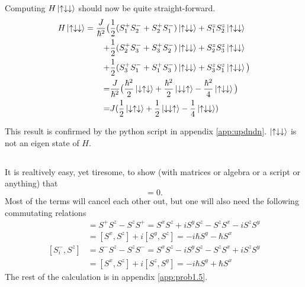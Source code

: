 \documentclass{article}
\begin{document}
Computing $H\ket{\uparrow\downarrow\downarrow}$ should now be quite straight-forward.
\begin{align*}
H\ket{\uparrow\downarrow\downarrow} = 
\frac{J}{\hbar^2} \big(&\frac{1}{2} (S_1^+S_2^- + S_2^+S_1^-)\ket{\uparrow\downarrow\downarrow} + S_1^zS_2^z\ket{\uparrow\downarrow\downarrow} \\
+&\frac{1}{2}(S_2^+S_3^- + S_3^+S_2^-)\ket{\uparrow\downarrow\downarrow} + S_2^zS_3^z\ket{\uparrow\downarrow\downarrow} \\
+&\frac{1}{2}(S_3^+S_1^- + S_1^+S_3^-)\ket{\uparrow\downarrow\downarrow} + S_3^zS_1^z\ket{\uparrow\downarrow\downarrow} \big)\\
=&\frac{J}{\hbar^2}\big(
\frac{\hbar^2}{2}\ket{\downarrow\uparrow\downarrow} + 
\frac{\hbar^2}{2}\ket{\downarrow\downarrow\uparrow} -
\frac{\hbar^2}{4}\ket{\uparrow\downarrow\downarrow} 
\big) \\
=&J(
\frac{1}{2}\ket{\downarrow\uparrow\downarrow} +
\frac{1}{2}\ket{\downarrow\downarrow\uparrow} -
\frac{1}{4}\ket{\uparrow\downarrow\downarrow})
\end{align*}

This result is confirmed by the python script in appendix \ref{app:updndn}. $\ket{\uparrow\downarrow\downarrow}$ is not an eigen state of $H$.

\subsection{}
It is realtively easy, yet tiresome, to show (with matrices or algebra or a script or anything) that
\begin{equation}
[H,S^z_{tot}]=0.
\end{equation}
Most of the terms will cancel each other out, but one will also need the following commutating relations
\begin{align*}
[S_i^+,S^z]&=S^+S^z-S^zS^+ = S^xS^z+iS^yS^z-S^zS^x-iS^zS^y \\
&= [S^x,S^z] + i[S^y, S^z] = -i\hbar S^y-\hbar S^x\\
[S_i^-,S^z]&=S^-S^z-S^zS^- = S^xS^z-iS^yS^z-S^zS^x+iS^zS^y \\
&= [S^x,S^z] + i[S^z, S^y] = -i\hbar S^y+\hbar S^x
\end{align*}
The rest of the calculation is in appendix \ref{app:prob1.5}.
\end{document}
